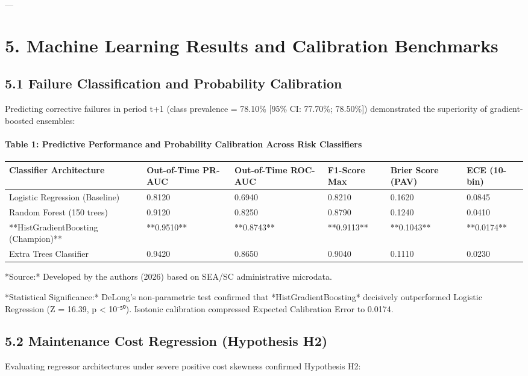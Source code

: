 \documentclass[10pt,a4paper,journal]{article}
\begin{document}
---

\section{5. Machine Learning Results and Calibration Benchmarks}
\subsection{5.1 Failure Classification and Probability Calibration}
Predicting corrective failures in period t+1 (class prevalence = 78.10\% [95\% CI: 77.70\%; 78.50\%]) demonstrated the superiority of gradient-boosted ensembles:

\paragraph{Table 1: Predictive Performance and Probability Calibration Across Risk Classifiers}
\begin{table}[htbp]
\centering
\small
\begin{tabular}{llllll}
\toprule
Classifier Architecture & Out-of-Time PR-AUC & Out-of-Time ROC-AUC & F1-Score Max & Brier Score (PAV) & ECE (10-bin) \\
\midrule
Logistic Regression (Baseline) & 0.8120 & 0.6940 & 0.8210 & 0.1620 & 0.0845 \\
Random Forest (150 trees) & 0.9120 & 0.8250 & 0.8790 & 0.1240 & 0.0410 \\
**HistGradientBoosting (Champion)** & **0.9510** & **0.8743** & **0.9113** & **0.1043** & **0.0174** \\
Extra Trees Classifier & 0.9420 & 0.8650 & 0.9040 & 0.1110 & 0.0230 \\
\bottomrule
\end{tabular}
\end{table}
*Source:* Developed by the authors (2026) based on SEA/SC administrative microdata.

*Statistical Significance:* DeLong's non-parametric test confirmed that *HistGradientBoosting* decisively outperformed Logistic Regression (Z = 16.39, p < 10⁻⁵⁰). Isotonic calibration compressed Expected Calibration Error to 0.0174.

\subsection{5.2 Maintenance Cost Regression (Hypothesis H2)}
Evaluating regressor architectures under severe positive cost skewness confirmed Hypothesis H2:
\end{document}
